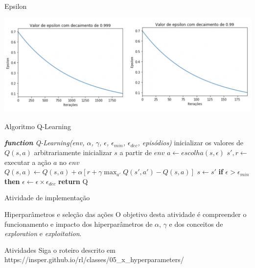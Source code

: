 \documentclass{beamer}
\begin{document}
\begin{frame}{Epsilon}
	  \begin{center}
		\includegraphics[width=\textwidth]{figuras/epsilon.png}
	\end{center}
\end{frame}

\begin{frame}{Algoritmo Q-Learning}
	
\begin{algorithmic} 
	\STATE \emph{\textbf{function} Q-Learning(env, $\alpha$, $\gamma$, $\epsilon$, $\epsilon_{min}$, $\epsilon_{dec}$, episódios)}
	\STATE inicializar os valores de $Q(s, a)$ arbitrariamente
	\STATE inicializar $s$ a partir de $env$
	\REPEAT
	\STATE $a \leftarrow escolha(s, \epsilon)$
	\STATE $s', r \leftarrow$ executar a ação $a$ no $env$
	\STATE $Q(s,a) \leftarrow Q(s,a) + \alpha [r +\gamma \max_{a'}{Q(s', a')} - Q(s,a)]$
	\STATE$s  \leftarrow s'$
	\STATE \textbf{if} $\epsilon > \epsilon_{min}$ \textbf{then} $\epsilon \leftarrow \epsilon \times \epsilon_{dec}$
	\ENDFOR
	\STATE \textbf{return} Q
\end{algorithmic}	
\end{frame}

\begin{frame}{Atividade de implementação}
		
	\begin{alertblock}{Hiperparâmetros e seleção das ações}
		O objetivo desta atividade é compreender o funcionamento e impacto dos hiperparâmetros de $\alpha$, $\gamma$ e dos conceitos de \textit{exploration} e \textit{exploitation}.
	\end{alertblock}
	
	\begin{block}{Atividades}
		Siga o roteiro descrito em https://insper.github.io/rl/classes/05\_x\_hyperparameters/ \href{https://insper.github.io/rl/classes/05_x_hyperparameters/}
		{}
	\end{block}

\end{frame}
\end{document}
